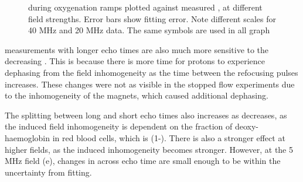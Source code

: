 \begin{figure}[h!p]

  \caption[\Rtwo vs \SOtwo at different field strengths]{\Rtwo during oxygenation ramps plotted against measured \SOtwo, at different field strengths. Error bars show fitting error. Note different \Rtwo scales for 40 MHz and 20 MHz data. The same symbols are used in all graph}
  \label{fig:contflow-R2SO2}
\end{figure}

\Rtwo measurements with longer echo times are also much more sensitive to the decreasing \SOtwo.
This is because there is more time for protons to experience dephasing from the field inhomogeneity as the time between the refocusing pulses increases.
These changes were not as visible in the stopped flow experiments due to the inhomogeneity of the magnets, which caused additional dephasing.

The splitting between long and short echo times also increases as \SOtwo decreases, as the induced field inhomogeneity is dependent on the fraction of deoxy-haemoglobin in red blood cells, which is (1-\SOtwo).
There is also a stronger effect at higher fields, as the induced inhomogeneity becomes stronger.
However, at the 5 MHz field (e), changes in \Rtwo across echo time are small enough to be within the uncertainty from fitting.

